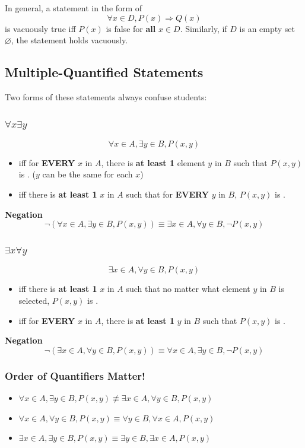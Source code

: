 \documentclass{article}
\theoremstyle{plain}
\theoremstyle{definition}
\theoremstyle{remark}
\begin{document}
In general, a statement in the form of 
\[ \forall x \in D, P(x) \Rightarrow Q(x) \]
is vacuously true iff $P(x)$ is false for \textbf{all} $x \in D$. 
Similarly, if $D$ is an empty set $\varnothing$, the statement holds vacuously.

\subsection{Multiple-Quantified Statements}
Two forms of these statements always confuse students:

\subsubsection{$\forall x \exists y$}
\[ \forall x \in A, \exists y \in B, P(x, y) \]
\begin{itemize}
    \item \textcolor{blue}{} iff for \textbf{EVERY} $x$ in $A$, there is \textbf{at least 1} element $y$ in $B$ such that $P(x,y)$ is \textcolor{blue}{}. ($y$ can be the same for each $x$)
    \item \textcolor{red}{} iff there is \textbf{at least 1} $x$ in $A$ such that for \textbf{EVERY} $y$ in $B$, $P(x,y)$ is \textcolor{red}{}.
\end{itemize}
\textbf{Negation}
\[ \neg(\forall x \in A, \exists y \in B, P(x, y)) \equiv \exists x \in A, \forall y \in B, \neg P(x, y) \]
    
\subsubsection{$\exists x \forall y$}
\[ \exists x \in A, \forall y \in B, P(x, y) \]
\begin{itemize}
    \item \textcolor{blue}{} iff there is \textbf{at least 1} $x$ in $A$ such that no matter what element $y$ in $B$ is selected, $P(x,y)$ is \textcolor{blue}{}.
    \item \textcolor{red}{} iff for \textbf{EVERY} $x$ in $A$, there is \textbf{at least 1} $y$ in $B$ such that $P(x,y)$ is \textcolor{red}{}.
\end{itemize}
\textbf{Negation}
\[ \neg(\exists x \in A, \forall y \in B, P(x, y)) \equiv \forall x \in A, \exists y \in B, \neg P(x, y) \]

\subsubsection{Order of Quantifiers Matter!}
\begin{itemize}
    \item $\forall x \in A, \exists y \in B, P(x, y) \not\equiv \exists x \in A, \forall y \in B, P(x, y)$
    \item $\forall x \in A, \forall y \in B, P(x, y) \equiv \forall y \in B, \forall x \in A, P(x, y)$
    \item $\exists x \in A, \exists y \in B, P(x, y) \equiv \exists y \in B, \exists x \in A, P(x, y)$
\end{itemize}
\end{document}
